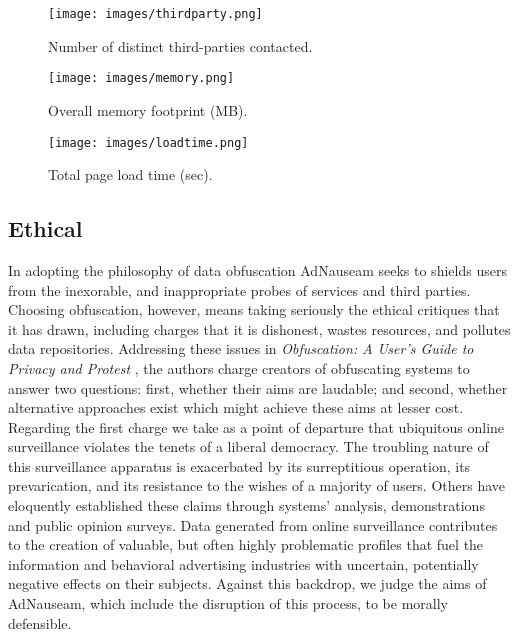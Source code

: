 \documentclass[conference]{IEEEtran}
\begin{document}
\begin{figure}[!t]
\centering
\texttt{[image: images/thirdparty.png]}
\caption{Number of distinct third-parties contacted.}
\label{fig:thirdparty}
\vspace{6mm}
\texttt{[image: images/memory.png]}
\caption{Overall memory footprint (MB).}
\label{fig:memory}
\vspace{6mm}
\texttt{[image: images/loadtime.png]}
\caption{Total page load time (sec).}
\label{fig:loadtime}
\end{figure}


\subsection{Ethical}

In adopting the philosophy of data obfuscation AdNauseam seeks to shields users from the inexorable, and inappropriate probes of services and third parties. Choosing obfuscation, however, means taking seriously the ethical critiques that it has drawn, including charges that it is dishonest, wastes resources, and pollutes data repositories. Addressing these issues in \emph{Obfuscation: A User's Guide to Privacy and Protest} \cite{Brunton}, the authors charge creators of obfuscating systems to answer two questions: first, whether their aims are laudable; and second, whether alternative approaches exist which might achieve these aims at lesser cost. Regarding the first charge we take as a point of departure that ubiquitous online surveillance violates the tenets of a liberal democracy. The troubling nature of this surveillance apparatus is exacerbated by its surreptitious operation, its prevarication, and its resistance to the wishes of a majority of users. Others have eloquently established these claims through systems' analysis, demonstrations and public opinion surveys. \cite{Turow, Goldfarb, Tucker} Data generated from online surveillance contributes to the creation of valuable, but often highly problematic profiles that fuel the information and behavioral advertising industries with uncertain, potentially negative effects on their subjects. Against this backdrop, we judge the aims of AdNauseam, which include the disruption of this process, to be morally defensible.
\end{document}
